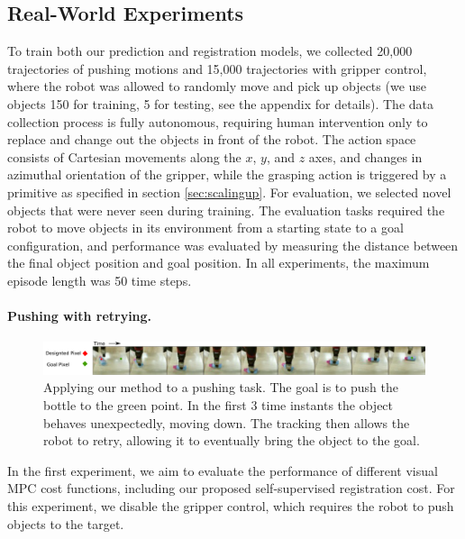 \subsection{Real-World Experiments}

To train both our prediction and registration models, we collected 20,000 trajectories of pushing motions and 15,000 trajectories with gripper control, where the robot was allowed to randomly move and pick up objects (we use objects 150 for training, 5 for testing, see the appendix for details). The data collection process is fully autonomous, requiring human intervention only to replace and change out the objects in front of the robot.
The action space consists of Cartesian movements along the $x$, $y$, and $z$ axes, and changes in azimuthal orientation of the gripper, while the grasping action is triggered by a primitive as specified in section \ref{sec:scalingup}. For evaluation, we selected novel objects that were never seen during training. The evaluation tasks required the robot to move objects in its environment from a starting state to a goal configuration, and performance was evaluated by measuring the distance between the final object position and goal position. In all experiments, the maximum episode length was 50 time steps.

\vspace{-0.1in}
\paragraph{Pushing with retrying.}
\begin{figure}
    \centering
    \includegraphics[width=1.0\textwidth]{images/push_correction.pdf}
    \caption{\small{Applying our method to a pushing task. The goal is to push the bottle to the green point. In the first 3 time instants the object behaves unexpectedly, moving down. The tracking then allows the robot to retry, allowing it to eventually bring the object to the goal.}}
    \label{fig:push_retry}
\end{figure}



In the first experiment, we aim to evaluate the performance of different visual MPC cost functions, including our proposed self-supervised registration cost. For this experiment, we disable the gripper control, which requires the robot to push objects to the target. 

